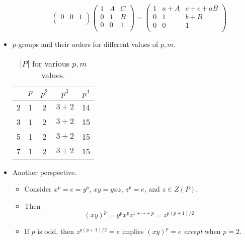 \documentclass[../notes.tex]{subfiles}
\begin{document}
\begin{itemize}
\begin{itemize}
\begin{equation*}
\begin{pmatrix}
                0 & 0 & 1\\
            \end{pmatrix}
            \begin{pmatrix}
                1 & A & C\\
                0 & 1 & B\\
                0 & 0 & 1\\
            \end{pmatrix}
            =
            \begin{pmatrix}
                1 & a+A & c+c+aB\\
                0 & 1 & b+B\\
                0 & 0 & 1\\
            \end{pmatrix}
        \end{equation*}
    \end{itemize}
    \item $p$-groups and their orders for different values of $p,m$.
    \begin{table}[h!]
        \centering
        \small
        \renewcommand{\arraystretch}{1.2}
        \begin{tabular}{c|c|c|c|c}
             & $p$ & $p^2$ & $p^3$ & $p^4$\\
            \hline
            2 & 1 & 2 & $3+2$ & 14\\
            3 & 1 & 2 & $3+2$ & 15\\
            5 & 1 & 2 & $3+2$ & 15\\
            7 & 1 & 2 & $3+2$ & 15\\
        \end{tabular}
        \caption{$|P|$ for various $p,m$ values.}
        \label{tab:pGroupOrder}
    \end{table}
    \item Another perspective.
    \begin{itemize}
        \item Consider $x^p=e=y^p$, $xy=yxz$, $z^p=e$, and $z\in Z(P)$.
        \item Then
        \begin{equation*}
            (xy)^p = y^px^pz^{1+\cdots+p}
            = z^{p(p+1)/2}
        \end{equation*}
        \item If $p$ is odd, then $z^{p(p+1)/2}=e$ implies $(xy)^p=e$ \emph{except} when $p=2$.
    \end{itemize}
\end{itemize}
\end{document}
